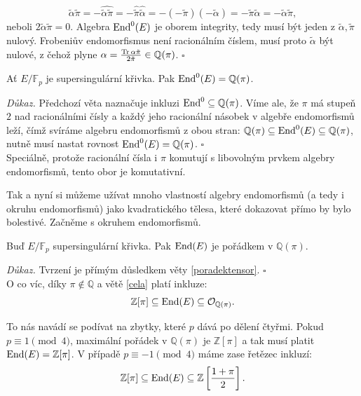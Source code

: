 \documentclass[12pt]{report}
\begin{document}
\begin{equation*}
\tilde{\alpha} \tilde{\pi} = -\widehat{\tilde{\alpha} \tilde{\pi}} = - \widehat{\tilde{\pi}} \widehat{\tilde{\alpha}} = - (- \tilde{\pi}) (-\tilde{\alpha}) = - \tilde{\pi} \tilde{\alpha}= - \tilde{\alpha} \tilde{\pi}, 
\end{equation*}
neboli $2 \tilde{\alpha} \tilde{\pi} = 0$. Algebra $\operatorname{End}^0 (E)$ je oborem integrity, tedy musí být jeden z $\tilde{\alpha},\tilde{\pi}$ nulový. Frobeniův endomorfismus není racionálním číslem, musí proto $\tilde{\alpha}$ být nulové, z čehož plyne $\alpha = \frac{\operatorname{Tr} \alpha \tilde{\pi}}{2 \tilde{\pi}} \in \mathbb{Q}(\pi)$. \hfill $\square$\\

\begin{dusledek}
Ať $E/\mathbb{F}_p$ je supersingulární křivka. Pak $\operatorname{End}^0 (E) = \mathbb{Q}(\pi)$.
\end{dusledek}
\noindent \textit{Důkaz.} Předchozí věta naznačuje inkluzi $\operatorname{End}^0 \subseteq \mathbb{Q}(\pi)$. Víme ale, že $\pi$ má stupeň $2$ nad racionálními čísly a každý jeho racionální násobek v algebře endomorfismů leží, čímž svíráme algebru endomorfismů z obou stran: $\mathbb{Q}(\pi) \subseteq \operatorname{End} ^0 (E) \subseteq \mathbb{Q}(\pi)$, nutně musí nastat rovnost $\operatorname{End}^0 (E) = \mathbb{Q}(\pi)$. \hfill $\square$\\

Speciálně, protože racionální čísla i $\pi$ komutují s libovolným prvkem algebry endomorfismů, tento obor je komutativní. 

Tak a nyní si můžeme užívat mnoho vlastností algebry endomorfismů (a tedy i okruhu endomorfismů) jako kvadratického tělesa, které dokazovat přímo by bylo bolestivé. Začněme s okruhem endomorfismů.

\begin{veta}
Buď $E/\mathbb{F}_p$ supersingulární křivka. Pak $\operatorname{End}(E)$ je pořádkem v $\mathbb{Q}(\pi)$. 
\end{veta}
\noindent \textit{Důkaz.} Tvrzení je přímým důsledkem věty \ref{poradektensor}. \hfill $\square$\\

O co víc, díky $\pi \not\in \mathbb{Q}$ a větě \ref{cela} platí inkluze:
\begin{equation*}
\mathbb{Z}[\pi] \subseteq \operatorname{End} (E) \subseteq \mathcal{O}_{\mathbb{Q}(\pi)}.
\end{equation*}

To nás navádí se podívat na zbytky, které $p$ dává po dělení čtyřmi. Pokud $p \equiv 1 \pmod{4}$, maximální pořádek v $\mathbb{Q}(\pi)$ je $\mathbb{Z}[\pi]$ a tak musí platit $\operatorname{End}(E) = \mathbb{Z}[\pi]$. V případě $p \equiv -1 \pmod{4}$ máme zase řetězec inkluzí:
\begin{equation*}
\mathbb{Z}[\pi] \subseteq \operatorname{End} (E) \subseteq \mathbb{Z} \left[ \frac{1+\pi}{2} \right].
\end{equation*}
\end{document}
